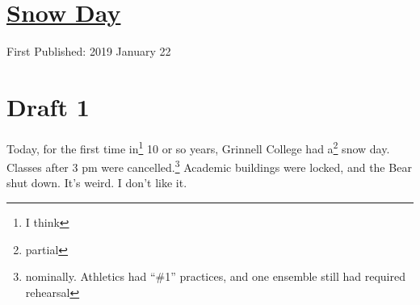 \documentclass[12pt]{article}[titlepage]
\newcommand{\say}[1]{``\#1''}
\newcommand{\1}{\={a}}
\newcommand{\2}{\={e}}
\newcommand{\3}{\={\i}}
\newcommand{\4}{\=o}
\newcommand{\5}{\=u}
\newcommand{\6}{\={A}}
\renewcommand{\,}{\textsuperscript{,}}
\begin{document}
\doublespacing
\section{\href{snow-day.html}{Snow Day}}
First Published: 2019 January 22
\section{Draft 1}
Today, for the first time in\footnote{I think} 10 or so years, Grinnell College had a\footnote{partial} snow day.
Classes after 3 pm were cancelled.\footnote{nominally. Athletics had \say{optional} practices, and one ensemble still had required rehearsal}
Academic buildings were locked, and the Bear shut down.
It's weird.
I don't like it.
\end{document}
